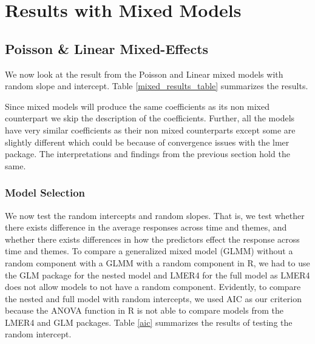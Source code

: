 \section{Results with Mixed Models}
\subsection{Poisson \& Linear Mixed-Effects}
We now look at the result from the Poisson and Linear mixed models with random slope and intercept. Table \ref{mixed_results_table} summarizes the results.

Since mixed models will produce the same coefficients as its non mixed counterpart we skip the description of the coefficients. Further, all the models have very similar coefficients as their non mixed counterparts except some are slightly different which could be because of convergence issues with the lmer package. The interpretations and findings from the previous section hold the same.
\subsubsection{Model Selection}
We now test the random intercepts and random slopes. That is, we test whether there exists difference in the average responses across time and themes, and whether there exists differences in how the predictors effect the response across time and themes.
To compare a generalized mixed model (GLMM) without a random component with a GLMM with a random component in R, we had to use the GLM package for the nested model and LMER4 for the full model as LMER4 does not allow models to not have a random component. Evidently, to compare the nested and full model with random intercepts, we used AIC as our criterion because the ANOVA function in R is not able to compare models from the LMER4 and GLM packages. Table \ref{aic} summarizes the results of testing the random intercept.

